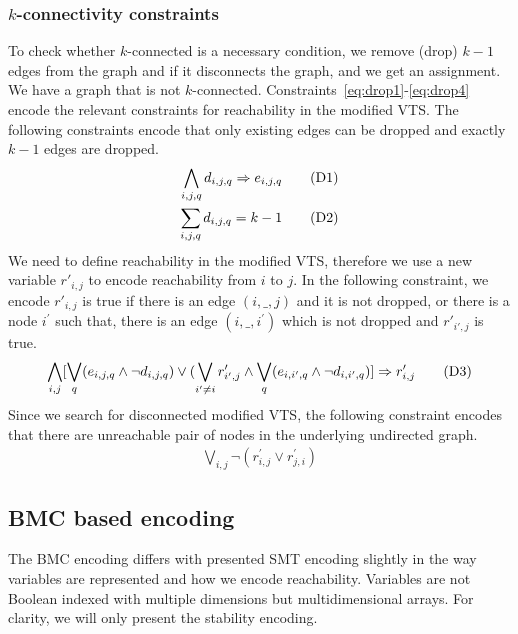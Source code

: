 \subsubsection{$k$-connectivity constraints}
To check whether $k$-connected is a necessary condition, we remove (drop) $k-1$ edges from the graph and if it
disconnects the graph, and we get an assignment. We have a graph that is not  $k$-connected.
%
Constraints~\ref{eq:drop1}-\ref{eq:drop4}
encode the relevant constraints for reachability
in the modified VTS. 
%
The following constraints encode that only
existing edges can be dropped and exactly $k-1$ edges are dropped.
\begin{align}
  \bigwedge\limits_{i,j,q} d_{i,j,q} \Rightarrow e_{i,j,q}  \tag{D1}\label{eq:drop1}\\
  \sum_{i,j,q} d_{i,j,q} = k-1
  \tag{D2}\label{eq:drop2}
\end{align}
We need to define reachability in the modified VTS, therefore we use
a new variable $r'_{i,j}$ to encode reachability from $i$ to $j$.
In the following constraint, we encode $r'_{i,j}$ is true if there is an
edge $(i,\_,j)$ and it is not dropped, or there is a node
$i^{\prime}$ such that, there is an edge $(i,\_,i^{\prime})$ which is
not dropped and $r'_{i',j}$ is true.
\begin{align}
\bigwedge\limits_{i,j}  [\bigvee_{q} (e_{i,j,q} \land  \neg d_{i,j,q}) \lor  (\bigvee_{i' \neq i}  r^{\prime}_{i',j} \land  \bigvee_{q} (e_{i,i',q} \land \neg d_{i,i',q}) ] \Rightarrow r^{\prime}_{i,j}  
  \tag{D3}\label{eq:drop3}
\end{align}
Since we search for disconnected modified VTS,
the following constraint encodes that there are 
unreachable pair of nodes in the underlying undirected graph.
\begin{align}
   \bigvee\limits_{i,j} \neg (r^{\prime}_{i,j} \lor r^{\prime}_{j,i})
  \tag{D4}\label{eq:drop4}
\end{align}



\subsection{BMC based encoding}

The BMC encoding differs with presented SMT encoding slightly in the way variables are represented and how we encode reachability.  
%
Variables are not Boolean indexed with multiple dimensions but multidimensional arrays. 
%
For clarity, we will only present the stability encoding.  

